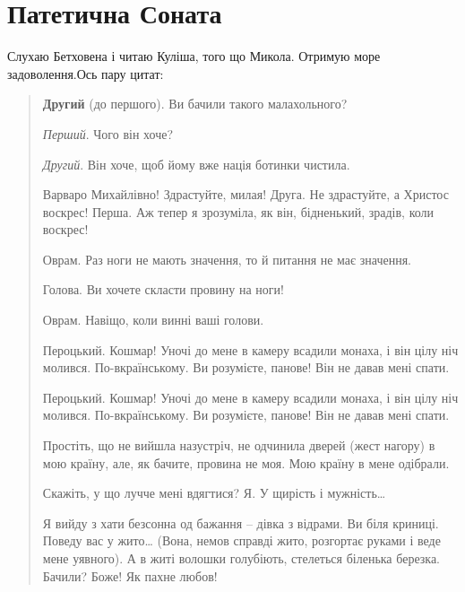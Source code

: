 \section*{Патетична Соната}

Слухаю Бетховена і читаю Куліша, того що Микола. Отримую море задоволення.Ось пару цитат:
\begin{flushright}

\begin{verse}
\textbf{Другий} (до першого). Ви бачили такого малахольного?

\textit{Перший}. Чого він хоче?

\emph{Другий}. Він хоче, щоб йому вже нація ботинки чистила.

Варваро Михайлівно! Здрастуйте, милая! Друга. Не здрастуйте, а Христос воскрес! Перша. Аж тепер я зрозуміла, як він, бідненький, зрадів, коли воскрес!

Оврам. Раз ноги не мають значення, то й питання не має значення.

Голова. Ви хочете скласти провину на ноги!

Оврам. Навіщо, коли винні ваші голови.


Пероцький. Кошмар! Уночі до мене в камеру всадили монаха, і він цілу ніч молився. По-вкраїнському. Ви розумієте, панове! Він не давав мені спати.

Пероцький. Кошмар! Уночі до мене в камеру всадили монаха, і він цілу ніч молився. По-вкраїнському. Ви розумієте, панове! Він не давав мені спати.

Простіть, що не вийшла назустріч, не одчинила дверей (жест нагору) в мою країну, але, як бачите, провина не моя. Мою країну в мене одібрали.

Скажіть, у що лучче мені вдягтися?
Я. У щирість і мужність…

Я вийду з хати безсонна од бажання – дівка з відрами. Ви біля криниці. Поведу вас у жито… (Вона, немов справді жито, розгортає руками і веде мене уявного). А в житі волошки голубіють, стелеться біленька березка. Бачили? Боже! Як пахне любов!
\end{verse}
\end{flushright}
